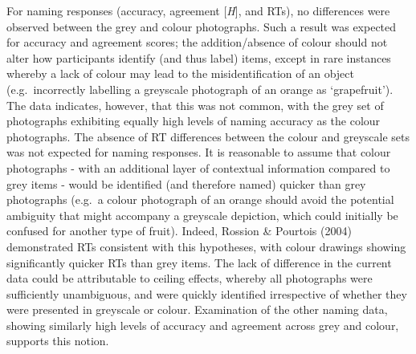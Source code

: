 \documentclass[
  11pt,
]{article}
\begin{document}
For naming responses (accuracy, agreement {[}\emph{H}{]}, and RTs), no
differences were observed between the grey and colour photographs. Such
a result was expected for accuracy and agreement scores; the
addition/absence of colour should not alter how participants identify
(and thus label) items, except in rare instances whereby a lack of
colour may lead to the misidentification of an object (e.g.~incorrectly
labelling a greyscale photograph of an orange as `grapefruit'). The data
indicates, however, that this was not common, with the grey set of
photographs exhibiting equally high levels of naming accuracy as the
colour photographs. The absence of RT differences between the colour and
greyscale sets was not expected for naming responses. It is reasonable
to assume that colour photographs - with an additional layer of
contextual information compared to grey items - would be identified (and
therefore named) quicker than grey photographs (e.g.~a colour photograph
of an orange should avoid the potential ambiguity that might accompany a
greyscale depiction, which could initially be confused for another type
of fruit). Indeed, Rossion \& Pourtois (2004) demonstrated RTs
consistent with this hypotheses, with colour drawings showing
significantly quicker RTs than grey items. The lack of difference in the
current data could be attributable to ceiling effects, whereby all
photographs were sufficiently unambiguous, and were quickly identified
irrespective of whether they were presented in greyscale or colour.
Examination of the other naming data, showing similarly high levels of
accuracy and agreement across grey and colour, supports this notion.
\end{document}
